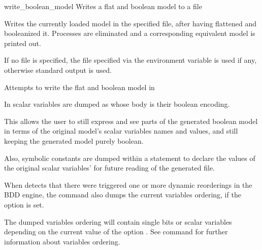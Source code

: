 \begin{nusmvCommand} {write\_boolean\_model} {Writes a flat and boolean model to a file}


Writes the currently loaded \tool model in the specified file, after
having flattened and booleanized it. Processes are eliminated and a
corresponding equivalent model is printed out.

If no file is specified, the file specified via the environment
variable  is used if any, otherwise
standard output is used.

\begin{cmdOpt}
 {Attempts to write the flat
and boolean \tool model in }
\end{cmdOpt}

In \tool scalar variables are dumped as  whose body
is their boolean encoding.
  
This allows the user to still express and see parts of the generated
boolean model in terms of the original model's scalar variables names
and values, and still keeping the generated model purely boolean.

Also, symbolic constants are dumped within a 
statement to declare the values of the original scalar variables' for
future reading of the generated file.

When \tool detects that there were triggered one or more dynamic
reorderings in the BDD engine, the command
 also dumps the current variables
ordering, if the option  is set.

The dumped variables ordering will contain single bits or scalar
variables depending on the current value of the option
. See command 
for further information about variables ordering.

\end{nusmvCommand}
